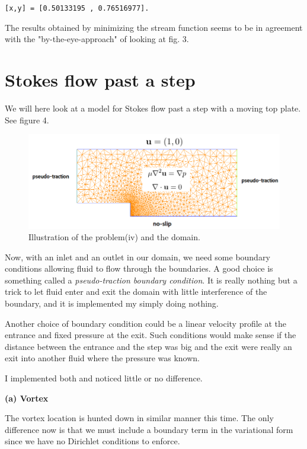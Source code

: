 \documentclass[11pt,a4paper,english]{article}
\numberwithin{equation}{section}
\begin{document}
\texttt{[x,y] =  [0.50133195 , 0.76516977].}

The results obtained by minimizing the stream function seems to be in agreement with the "by-the-eye-approach" of looking at fig. 3.  


\newpage
\section{Stokes flow past a step}

We will here look at a model for Stokes flow past a step with a moving top plate. See figure 4.

\begin{figure}[h!]
\begin{center}
  \includegraphics[scale=0.4]{stokes_step.png}
  \end{center}
  \caption{Illustration of the problem(iv) and the domain.}
\end{figure}

Now, with an inlet and an outlet in our domain, we need some boundary conditions allowing fluid to flow through the boundaries. A good choice is something called a \emph{pseudo-traction boundary condition}. It is really nothing but a trick to let fluid enter and exit the domain with little interference of the boundary, and it is implemented my simply doing nothing. 

Another choice of boundary condition could be a linear velocity profile at the entrance and fixed pressure at the exit. Such conditions would make sense if the distance between the entrance and the step was big and the exit were really an exit into another fluid where the pressure was known. 

I implemented both and noticed little or no difference. 

\textbf{(a) Vortex}

The vortex location is hunted down in similar manner this time. The only difference now is that we must include a boundary term in the variational form since we have no Dirichlet conditions to enforce.
\end{document}
